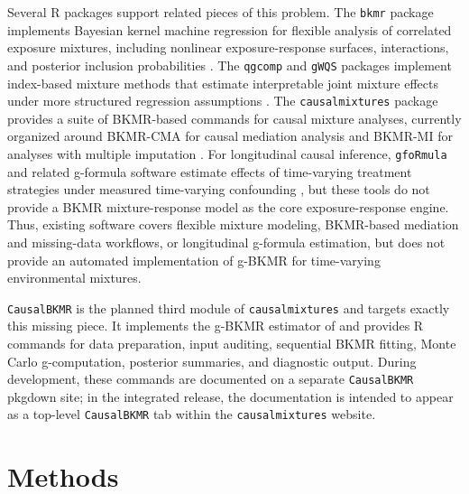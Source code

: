 \documentclass[11pt]{article}
\newcommand{\pkg}[1]{\texttt{#1}}
\begin{document}
Several R packages support related pieces of this problem. The \pkg{bkmr} package implements Bayesian kernel machine regression for flexible analysis of correlated exposure mixtures, including nonlinear exposure-response surfaces, interactions, and posterior inclusion probabilities \citep{bobb_bkmr_2018}. The \pkg{qgcomp} and \pkg{gWQS} packages implement index-based mixture methods that estimate interpretable joint mixture effects under more structured regression assumptions \citep{qgcomp_package,gwqs_package}. The \pkg{causalmixtures} package provides a suite of BKMR-based commands for causal mixture analyses, currently organized around BKMR-CMA for causal mediation analysis and BKMR-MI for analyses with multiple imputation \citep{causalmixtures_package}. For longitudinal causal inference, \pkg{gfoRmula} and related g-formula software estimate effects of time-varying treatment strategies under measured time-varying confounding \citep{mcgrath_gformula_2020,gformula_package}, but these tools do not provide a BKMR mixture-response model as the core exposure-response engine. Thus, existing software covers flexible mixture modeling, BKMR-based mediation and missing-data workflows, or longitudinal g-formula estimation, but does not provide an automated implementation of g-BKMR for time-varying environmental mixtures.

\pkg{CausalBKMR} is the planned third module of \pkg{causalmixtures} and targets exactly this missing piece. It implements the g-BKMR estimator of \citet{chai_gbkmr} and provides R commands for data preparation, input auditing, sequential BKMR fitting, Monte Carlo g-computation, posterior summaries, and diagnostic output. During development, these commands are documented on a separate \pkg{CausalBKMR} pkgdown site; in the integrated release, the documentation is intended to appear as a top-level \pkg{CausalBKMR} tab within the \pkg{causalmixtures} website.

\section*{Methods}
\label{sec:methods}
\end{document}
